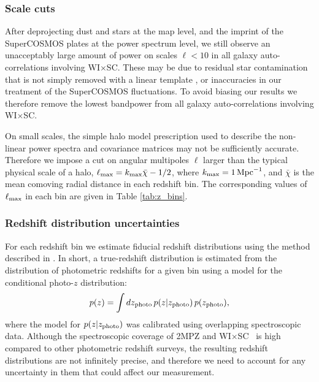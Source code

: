 \documentclass[useAMS,usenatbib]{mn2e}
\newcommand{\wisc}{WI$\times$SC}
\begin{document}
    \subsubsection{Scale cuts}\label{sssec:methods.syst.scales}
      After deprojecting dust and stars at the map level, and the imprint of the SuperCOSMOS plates at the power spectrum level, we still observe an unacceptably large amount of power on scales $\ell<10$ in all galaxy auto-correlations involving \wisc. These may be due to residual star contamination that is not simply removed with a linear template \citep{2019JCAP...08..037X}, or inaccuracies in our treatment of the SuperCOSMOS fluctuations. To avoid biasing our results we therefore remove the lowest bandpower from all galaxy auto-correlations involving \wisc.
      
      On small scales, the simple halo model prescription used to describe the non-linear power spectra and covariance matrices may not be sufficiently accurate. Therefore we impose a cut on angular multipoles $\ell$ larger than the typical physical scale of a halo, $\ell_{\rm max}=k_{\rm max}\bar{\chi}-1/2$, where $k_{\rm max}=1\,{\rm Mpc}^{-1}$, and $\bar{\chi}$ is the mean comoving radial distance in each redshift bin. The corresponding values of $\ell_{\rm max}$ in each bin are given in Table \ref{tab:z_bins}.
      
    \subsubsection{Redshift distribution uncertainties}\label{sssec:methods.syst.photoz}
      For each redshift bin we estimate fiducial redshift distributions using the method described in \cite{2018MNRAS.481.1133P}. In short, a true-redshift distribution is estimated from the distribution of photometric redshifts for a given bin using a model for the conditional photo-$z$ distribution:
      \begin{equation}\label{eq:nz_calc}
        p(z)=\int dz_{\rm photo}\,p(z|z_{\rm photo})\,p(z_{\rm photo}),
      \end{equation}
      where the model for $p(z|z_{\rm photo})$ was calibrated using overlapping spectroscopic data. Although the spectroscopic coverage of 2MPZ and \wisc~ is high compared to other photometric redshift surveys, the resulting redshift distributions are not infinitely precise, and therefore we need to account for any uncertainty in them that could affect our measurement.
\end{document}

